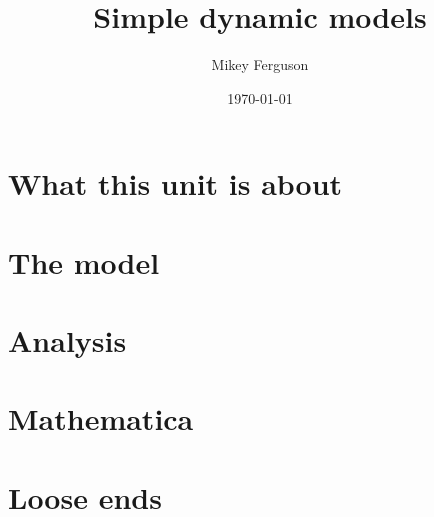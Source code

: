 \documentclass[11pt]{article}
\title{Simple dynamic models}
\author{Mikey Ferguson}
\date{\today}
\begin{document}
\maketitle
\tableofcontents
\bigskip

\section{What this unit is about}

\section{The model}

\section{Analysis}

\section{Mathematica}

\section{Loose ends}
\end{document}
